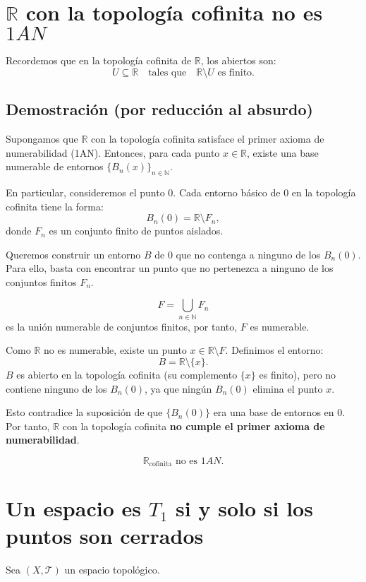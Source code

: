 \documentclass[12pt]{article}
\begin{document}
\section*{$\mathbb{R}$ con la topología cofinita no es $1AN$}

Recordemos que en la topología cofinita de $\mathbb{R}$, los abiertos son:
\[
U \subseteq \mathbb{R} \quad \text{tales que} \quad \mathbb{R}\setminus U \text{ es finito.}
\]

\subsection*{Demostración (por reducción al absurdo)}

Supongamos que $\mathbb{R}$ con la topología cofinita satisface el primer axioma de numerabilidad (1AN).  
Entonces, para cada punto $x \in \mathbb{R}$, existe una base numerable de entornos $\{B_n(x)\}_{n\in\mathbb{N}}$.

\medskip
En particular, consideremos el punto $0$.  
Cada entorno básico de $0$ en la topología cofinita tiene la forma:
\[
B_n(0) = \mathbb{R} \setminus F_n,
\]
donde $F_n$ es un conjunto finito de puntos aislados.

\medskip
Queremos construir un entorno $B$ de $0$ que no contenga a ninguno de los $B_n(0)$.  
Para ello, basta con encontrar un punto que no pertenezca a ninguno de los conjuntos finitos $F_n$.

\[
F = \bigcup_{n\in\mathbb{N}} F_n
\]
es la unión numerable de conjuntos finitos, por tanto, $F$ es numerable.

\medskip
Como $\mathbb{R}$ no es numerable, existe un punto $x \in \mathbb{R} \setminus F$.  
Definimos el entorno:
\[
B = \mathbb{R} \setminus \{x\}.
\]
$B$ es abierto en la topología cofinita (su complemento $\{x\}$ es finito),  
pero no contiene ninguno de los $B_n(0)$, ya que ningún $B_n(0)$ elimina el punto $x$.

\medskip
Esto contradice la suposición de que $\{B_n(0)\}$ era una base de entornos en $0$.  
Por tanto, $\mathbb{R}$ con la topología cofinita \textbf{no cumple el primer axioma de numerabilidad}.

\[
\boxed{\mathbb{R}_{\text{cofinita}} \text{ no es } 1AN.}
\]
\section*{Un espacio es $T_1$ si y solo si los puntos son cerrados}

Sea $(X,\mathcal T)$ un espacio topológico.
\end{document}
